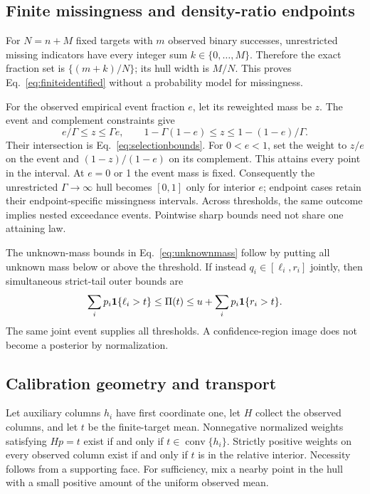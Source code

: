 \subsection{Finite missingness and density-ratio endpoints}

For $N=n+M$ fixed targets with $m$ observed binary successes, unrestricted missing indicators have every integer sum $k\in\{0,\ldots,M\}$. Therefore the exact fraction set is $\{(m+k)/N\}$; its hull width is $M/N$. This proves Eq.~\eqref{eq:finiteidentified} without a probability model for missingness.

For the observed empirical event fraction $e$, let its reweighted mass be $z$. The event and complement constraints give
\begin{equation}
 e/\Gamma\leq z\leq\Gamma e,\qquad
 1-\Gamma(1-e)\leq z\leq1-(1-e)/\Gamma.
\end{equation}
Their intersection is Eq.~\eqref{eq:selectionbounds}. For $0<e<1$, set the weight to $z/e$ on the event and $(1-z)/(1-e)$ on its complement. This attains every point in the interval. At $e=0$ or 1 the event mass is fixed. Consequently the unrestricted $\Gamma\to\infty$ hull becomes $[0,1]$ only for interior $e$; endpoint cases retain their endpoint-specific missingness intervals. Across thresholds, the same outcome implies nested exceedance events. Pointwise sharp bounds need not share one attaining law.

The unknown-mass bounds in Eq.~\eqref{eq:unknownmass} follow by putting all unknown mass below or above the threshold. If instead $q_i\in[\ell_i,r_i]$ jointly, then simultaneous strict-tail outer bounds are
\begin{equation}
 \sum_i p_i\mathbf 1\{\ell_i>t\}\leq\Pi(t)
 \leq u+\sum_i p_i\mathbf 1\{r_i>t\}.
\end{equation}
The same joint event supplies all thresholds. A confidence-region image does not become a posterior by normalization.

\subsection{Calibration geometry and transport}

Let auxiliary columns $h_i$ have first coordinate one, let $H$ collect the observed columns, and let $t$ be the finite-target mean. Nonnegative normalized weights satisfying $Hp=t$ exist if and only if $t\in\operatorname{conv}\{h_i\}$. Strictly positive weights on every observed column exist if and only if $t$ is in the relative interior. Necessity follows from a supporting face. For sufficiency, mix a nearby point in the hull with a small positive amount of the uniform observed mean.

